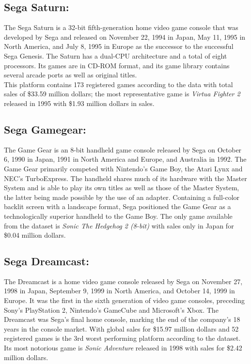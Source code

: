 \subsection{Sega Saturn:}
The Sega Saturn is a 32-bit fifth-generation home
video game console that was developed by Sega and released on November 22,
1994 in Japan, May 11, 1995 in North America, and July 8, 1995 in Europe as
the successor to the successful Sega Genesis. The Saturn has a dual-CPU
architecture and a total of eight processors. Its games are in CD-ROM format,
and its game library contains several arcade ports as well as original
titles\cite{SegaSaturn}.\\
This platform contains 173 registered games according to the data with total
sales of \$33.59 million dollars; the most representative game is
\textit{Virtua Fighter 2} released in 1995 with \$1.93 million dollars in
sales.

\subsection{Sega Gamegear:}
The Game Gear is an 8-bit handheld game console released by Sega on October
6, 1990 in Japan, 1991 in North America and Europe, and Australia in
1992. The Game Gear primarily competed with Nintendo's Game Boy, the Atari
Lynx and NEC's TurboExpress. The handheld shares much of its hardware with
the Master System and is able to play its own titles as well as those of the
Master System, the latter being made possible by the use of an
adapter. Containing a full-color backlit screen with a landscape format, Sega
positioned the Game Gear as a technologically superior handheld to the Game
Boy\cite{SegaGameGear}. The only game available from the dataset is
\textit{Sonic The Hedgehog 2 (8-bit)} with sales only in Japan for \$0.04
million dollars.

\subsection{Sega Dreamcast:}
The Dreamcast is a home video game console released by Sega on November 27,
1998 in Japan, September 9, 1999 in North America, and October 14, 1999 in
Europe. It was the first in the sixth generation of video game consoles,
preceding Sony's PlayStation 2, Nintendo's GameCube and Microsoft's Xbox. The
Dreamcast was Sega's final home console, marking the end of the company's 18
years in the console market\cite{SegaDreamcast}. With global sales for
\$15.97 million dollars and 52 registered games is the 3rd worst performing
platform according to the dataset. Its most notorious game is \textit{Sonic
  Adventure} released in 1998 with sales for \$2.42 million dollars.\\

